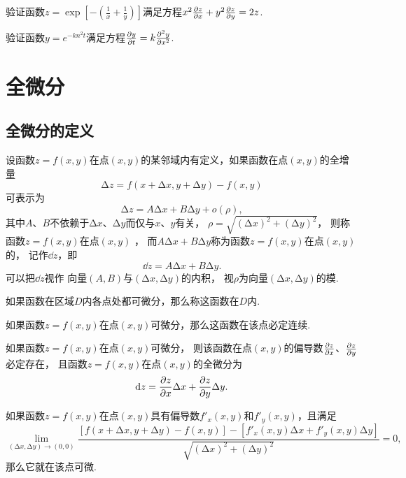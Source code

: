 \begin{example}
验证函数\(z = \exp[-\left(\frac{1}{x}+\frac{1}{y}\right)]\)满足方程\(x^2 \pdv{z}{x} + y^2 \pdv{z}{y} = 2z\).
\end{example}

\begin{example}
验证函数\(y = e^{-k n^2 t}\)满足方程\(\pdv{y}{t} = k \pdv[2]{y}{x}\).
\end{example}

\section{全微分}
\subsection{全微分的定义}
\begin{definition}
设函数\(z=f(x,y)\)在点\((x,y)\)的某邻域内有定义，如果函数在点\((x,y)\)的全增量\[
\increment z = f(x+\increment x,y+\increment y)-f(x,y)
\]可表示为\[
\increment z = A \increment x + B \increment y + o(\rho),
\]其中\(A\)、\(B\)不依赖于\(\increment x\)、\(\increment y\)而仅与\(x\)、\(y\)有关，
\(\rho=\sqrt{(\increment x)^2+(\increment y)^2}\)，
则称函数\(z=f(x,y)\)在点\((x,y)\) ，
而\(A \increment x + B \increment y\)称为函数\(z=f(x,y)\)在点\((x,y)\)的，
记作\(\dd{z}\)，即\[
\dd{z} = A \increment x + B \increment y.
\]可以把\(\dd{z}\)视作%
向量\((A,B)\)与\((\increment x,\increment y)\)的内积，
视\(\rho\)为向量\((\increment x,\increment y)\)的模.

如果函数在区域\(D\)内各点处都可微分，那么称这函数在\(D\)内.
\end{definition}

\begin{theorem}
如果函数\(z=f(x,y)\)在点\((x,y)\)可微分，那么这函数在该点必定连续.
\end{theorem}

\begin{theorem}[必要条件]\label{theorem:多元函数微分法.二元函数可微的必要条件}
如果函数\(z=f(x,y)\)在点\((x,y)\)可微分，
则该函数在点\((x,y)\)的偏导数\(\pdv{z}{x}\)、\(\pdv{z}{y}\)必定存在，
且函数\(z=f(x,y)\)在点\((x,y)\)的全微分为\[
\dd{z} = \pdv{z}{x} \Delta x + \pdv{z}{y} \Delta y.
\]
\end{theorem}

\begin{corollary}
如果函数\(z=f(x,y)\)在点\((x,y)\)具有偏导数\(f'_x(x,y)\)和\(f'_y(x,y)\)，且满足\[
\lim_{(\increment x,\increment y)\to(0,0)}
 \frac{[f(x+\increment x,y+\increment y)-f(x,y)]-[f'_x(x,y) \increment x + f'_y(x,y) \increment y]}{\sqrt{(\increment x)^2+(\increment y)^2}} = 0,
\]那么它就在该点可微.
\end{corollary}

